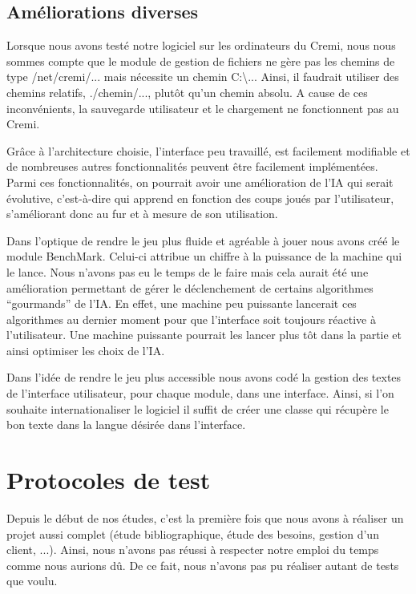 \documentclass[a4paper,12pt]{report}
\begin{document}
\subsection{Améliorations diverses}

Lorsque nous avons testé notre logiciel sur les ordinateurs du Cremi, nous nous sommes compte que le module de gestion de fichiers ne gère pas les chemins de type /net/cremi/... mais nécessite un chemin C:\textbackslash{}...
Ainsi, il faudrait utiliser des chemins relatifs, ./chemin/..., plutôt qu'un chemin absolu. 
A cause de ces inconvénients, la sauvegarde utilisateur et le chargement ne fonctionnent pas au Cremi. 


Grâce à l’architecture choisie, l’interface peu travaillé, est facilement modifiable et de nombreuses autres fonctionnalités peuvent être facilement implémentées. Parmi ces fonctionnalités, on pourrait avoir une amélioration de l’IA qui serait évolutive, c’est-à-dire qui apprend en fonction des coups joués par l’utilisateur, s’améliorant donc au fur et à mesure de son utilisation.

Dans l’optique de rendre le jeu plus fluide et agréable à jouer nous avons créé le module BenchMark. Celui-ci attribue un chiffre à la puissance de la machine qui le lance. Nous n’avons pas eu le temps de le faire mais cela aurait été une amélioration permettant de gérer le déclenchement de certains algorithmes “gourmands” de l’IA. En effet, une machine peu puissante lancerait ces algorithmes au dernier moment pour que l’interface soit toujours réactive à l’utilisateur. Une machine puissante pourrait les lancer plus tôt dans la partie et ainsi optimiser les choix de l’IA.

Dans l’idée de rendre le jeu plus accessible nous avons codé la gestion des textes de l’interface utilisateur, pour chaque module, dans une interface. Ainsi, si l’on souhaite internationaliser le logiciel il suffit de créer une classe qui récupère le bon texte dans la langue désirée dans l’interface.


\section{Protocoles de test}

Depuis le début de nos études, c’est la première fois que nous avons à réaliser un projet aussi complet (étude bibliographique, étude des besoins, gestion d’un client, ...). Ainsi, nous n’avons pas réussi à respecter notre emploi du temps comme nous aurions dû. De ce fait, nous n’avons pas pu réaliser autant de tests que voulu. 
\end{document}
